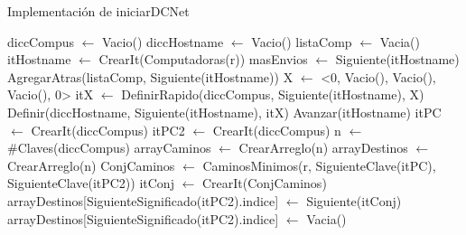 \begin{Algoritmos}
\begin{algorithm}
\caption{Implementaci\'on de iniciarDCNet}
\begin{algorithmic}[0]
	\State diccCompus $\gets$ Vacio()  
	\State diccHostname $\gets$ Vacio()  
	\State listaComp $\gets$ Vacia() 
	\State itHostname $\gets$  CrearIt(Computadoras(r)) 
	\State masEnvios $\gets$ Siguiente(itHostname) 
	 
		\State AgregarAtras(listaComp, Siguiente(itHostname)) 
		\State X $\gets$ <0, Vacio(), Vacio(), Vacio(), 0> 
		\State itX $\gets$ DefinirRapido(diccCompus, Siguiente(itHostname), X)   
		\State Definir(diccHostname, Siguiente(itHostname), itX)  
		\State Avanzar(itHostname) 
	\EndWhile
	\State itPC $\gets$ CrearIt(diccCompus) 
	\State itPC2 $\gets$ CrearIt(diccCompus) 				 	 	
	\State n $\gets$ \#Claves(diccCompus) 
	\State arrayCaminos $\gets$ CrearArreglo(n) 
	 
		\State arrayDestinos $\gets$ CrearArreglo(n) 
		 
			\State ConjCaminos $\gets$ CaminosMinimos(r, SiguienteClave(itPC), SiguienteClave(itPC2)) 
			\State itConj $\gets$ CrearIt(ConjCaminos) 
			   
				\State arrayDestinos[SiguienteSignificado(itPC2).indice] $\gets$ Siguiente(itConj) 
			\Else 
				\State arrayDestinos[SiguienteSignificado(itPC2).indice] $\gets$ Vacia() 
			\EndIf
			
	
\end{algorithmic}
\end{algorithm}


\end{Algoritmos}
